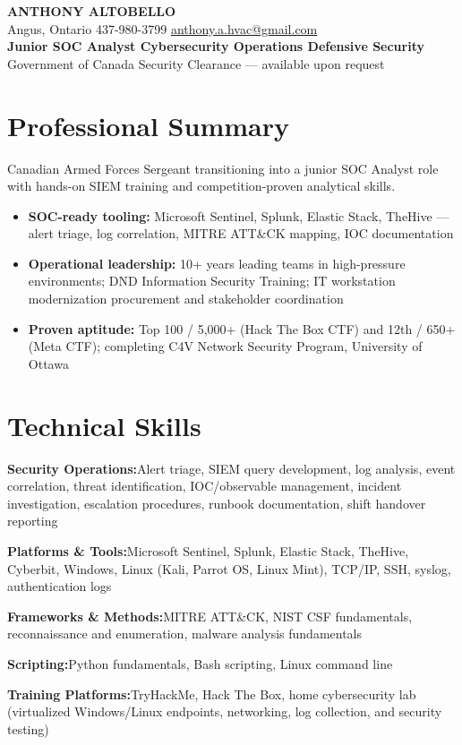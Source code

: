 \documentclass[10pt,letterpaper]{article}
\newcommand{\resumeLine}[2]{%
  \par\noindent\textbf{#1}\hspace{0.35em}#2\par\vspace{1pt}%
}
\begin{document}
\begin{center}
  {\LARGE\bfseries ANTHONY ALTOBELLO}\\[4pt]
  Angus, Ontario \textbar{} 437-980-3799 \textbar{} \href{mailto:anthony.a.hvac@gmail.com}{anthony.a.hvac@gmail.com}\\[2pt]
  \textbf{Junior SOC Analyst \textbar{} Cybersecurity Operations \textbar{} Defensive Security}\\[2pt]
  Government of Canada Security Clearance --- available upon request
\end{center}

\section{Professional Summary}
Canadian Armed Forces Sergeant transitioning into a junior SOC Analyst role with hands-on SIEM training and competition-proven analytical skills.
\begin{itemize}
  \item \textbf{SOC-ready tooling:} Microsoft Sentinel, Splunk, Elastic Stack, TheHive --- alert triage, log correlation, MITRE ATT\&CK mapping, IOC documentation
  \item \textbf{Operational leadership:} 10+ years leading teams in high-pressure environments; DND Information Security Training; IT workstation modernization procurement and stakeholder coordination
  \item \textbf{Proven aptitude:} Top 100 / 5,000+ (Hack The Box CTF) and 12th / 650+ (Meta CTF); completing C4V Network Security Program, University of Ottawa
\end{itemize}

\section{Technical Skills}
\resumeLine{Security Operations:}{Alert triage, SIEM query development, log analysis, event correlation, threat identification, IOC/observable management, incident investigation, escalation procedures, runbook documentation, shift handover reporting}
\resumeLine{Platforms \& Tools:}{Microsoft Sentinel, Splunk, Elastic Stack, TheHive, Cyberbit, Windows, Linux (Kali, Parrot OS, Linux Mint), TCP/IP, SSH, syslog, authentication logs}
\resumeLine{Frameworks \& Methods:}{MITRE ATT\&CK, NIST CSF fundamentals, reconnaissance and enumeration, malware analysis fundamentals}
\resumeLine{Scripting:}{Python fundamentals, Bash scripting, Linux command line}
\resumeLine{Training Platforms:}{TryHackMe, Hack The Box, home cybersecurity lab (virtualized Windows/Linux endpoints, networking, log collection, and security testing)}
\end{document}
